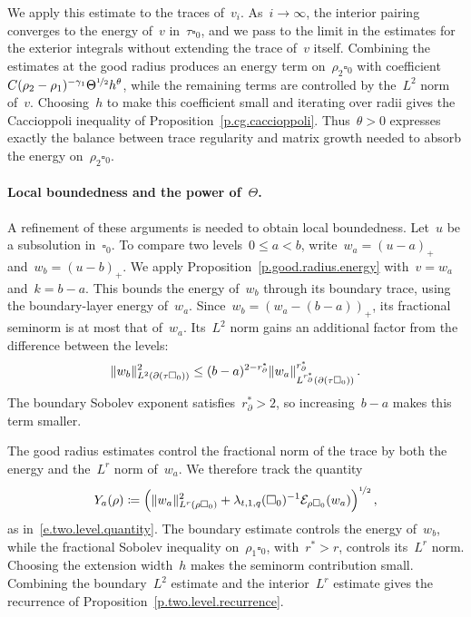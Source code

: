 \documentclass[11pt,letterpaper]{article}
\numberwithin{equation}{section}
\theoremstyle{definition}
\newcommand{\nf}{\nicefrac}
\newcommand{\cu}{\square}
\DeclarePairedDelimiter{\norm}{\lVert}{\rVert}
\newcommand{\Ener}{\mathcal E}
\begin{document}
We apply this estimate to the traces of~$v_i$. As~$i\to\infty$, the interior pairing converges to the energy of~$v$ in~$\tau\cu_0$, and we pass to the limit in the estimates for the exterior integrals without extending the trace of~$v$ itself. Combining the estimates at the good radius produces an energy term on~$\rho_2\cu_0$ with coefficient~$C(\rho_2-\rho_1)^{-\gamma_1}\Theta^{\nf12}h^\theta$, while the remaining terms are controlled by the~$L^2$ norm of~$v$. Choosing~$h$ to make this coefficient small and iterating over radii gives the Caccioppoli inequality of Proposition~\ref{p.cg.caccioppoli}. Thus~$\theta>0$ expresses exactly the balance between trace regularity and matrix growth needed to absorb the energy on~$\rho_2\cu_0$. \paragraph{Local boundedness and the power of~$\Theta$.} A refinement of these arguments is needed to obtain local boundedness. Let~$u$ be a subsolution in~$\cu_0$. To compare two levels~$0\leq a<b$, write~$w_a=(u-a)_+$ and~$w_b=(u-b)_+$. We apply Proposition~\ref{p.good.radius.energy} with~$v=w_a$ and~$k=b-a$. This bounds the energy of~$w_b$ through its boundary trace, using the boundary-layer energy of~$w_a$. Since~$w_b=(w_a-(b-a))_+$, its fractional seminorm is at most that of~$w_a$. Its~$L^2$ norm gains an additional factor from the difference between the levels:
\begin{equation*}
    \norm{w_b}_{L^2(\partial(\tau\cu_0))}^2
    \leq
    (b-a)^{2-r_\partial^*}
    \norm{w_a}_{L^{r_\partial^*}(\partial(\tau\cu_0))}^{r_\partial^*}
    \,.
\end{equation*}
The boundary Sobolev exponent satisfies~$r_\partial^*>2$, so increasing~$b-a$ makes this term smaller.

The good radius estimates control the fractional norm of the trace by both the energy and the~$L^r$ norm of~$w_a$. We therefore track the quantity
\begin{equation*}
    Y_a(\rho)\coloneqq
    \Bigl(
        \norm{w_a}_{L^r(\rho\cu_0)}^2
        +\lambda_{t,1,q}(\cu_0)^{-1}
        \Ener_{\rho\cu_0}(w_a)
    \Bigr)^{\nf12}
    \,,
\end{equation*}
as in~\eqref{e.two.level.quantity}. The boundary estimate controls the energy of~$w_b$, while the fractional Sobolev inequality on~$\rho_1\cu_0$, with~$r^*>r$, controls its~$L^r$ norm. Choosing the extension width~$h$ makes the seminorm contribution small. Combining the boundary~$L^2$ estimate and the interior~$L^r$ estimate gives the recurrence of Proposition~\ref{p.two.level.recurrence}.
\end{document}
